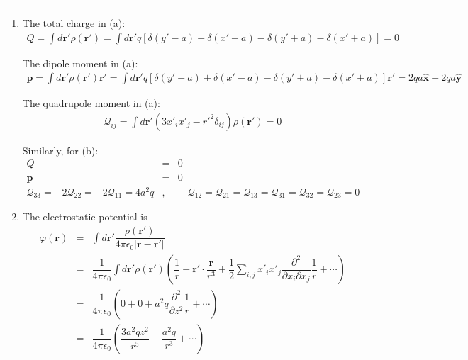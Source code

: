 \documentclass[a4paper,9pt]{article}
\begin{document}
\begin{enumerate}
\begin{enumerate}
\begin{figure}[h]
    \end{figure}\label{fig1}
  \end{enumerate}
  \rule[0pt]{6cm}{0.05em}
  \begin{enumerate}
    \item  The total charge in (a):
    \begin{eqnarray}
      Q=\int d\boldsymbol{r}'\rho(\boldsymbol{r}')=\int d\boldsymbol{r}' q\left[\delta(y'-a)+\delta(x'-a)-\delta(y'+a)-\delta(x'+a)\right]=0
    \end{eqnarray}
    
    The dipole moment in (a):
    \begin{eqnarray}
      \boldsymbol{p}=\int d\boldsymbol{r}'\rho(\boldsymbol{r}')\boldsymbol{r}'=\int d\boldsymbol{r}'q\left[\delta(y'-a)+\delta(x'-a)-\delta(y'+a)-\delta(x'+a)\right]\boldsymbol{r}'=2qa\hat{\boldsymbol{x}}+2qa\hat{\boldsymbol{y}}
    \end{eqnarray}

    The quadrupole moment in (a):
    \begin{eqnarray}
      \mathcal{Q}_{ij}=\int d\boldsymbol{r}'(3x'_{i}x'_{j}-r'^2\delta_{ij})\rho(\boldsymbol{r}')=0
    \end{eqnarray}

    Similarly, for (b):
    \begin{eqnarray}
      Q&=&0\\
      \boldsymbol{p}&=&0\\
      \mathcal{Q}_{33}=-2\mathcal{Q}_{22}=-2\mathcal{Q}_{11}=4a^2q&,&\quad\mathcal{Q}_{12}=\mathcal{Q}_{21}=\mathcal{Q}_{13}=\mathcal{Q}_{31}=\mathcal{Q}_{32}=\mathcal{Q}_{23}=0
    \end{eqnarray}

    \item The electrostatic potential is 
    \begin{eqnarray}
      \varphi(\boldsymbol{r})&=&\int d\boldsymbol{r}'\dfrac{\rho(\boldsymbol{r}')}{4\pi\epsilon_0|\boldsymbol{r}-\boldsymbol{r}'|}\nonumber\\
      &=&\dfrac{1}{4\pi\epsilon_0}\int d\boldsymbol{r}'\rho(\boldsymbol{r}')(\dfrac{1}{r}+\boldsymbol{r}'\cdot\dfrac{\boldsymbol{r}}{r^3}+\dfrac{1}{2}\sum_{i,j}x'_i x'_j\dfrac{\partial^2}{\partial x_i \partial x_j}\dfrac{1}{r}+\dotsm)\nonumber\\
      &=&\dfrac{1}{4\pi\epsilon_0}(0+0+a^2q\dfrac{\partial^2}{\partial z^2}\dfrac{1}{r}+\dotsm)\nonumber\\
      &=&\dfrac{1}{4\pi\epsilon_0}(\dfrac{3a^2qz^2}{r^5}-\dfrac{a^2q}{r^3}+\dotsm)
    \end{eqnarray}


\end{enumerate}
\end{enumerate}
\end{document}
